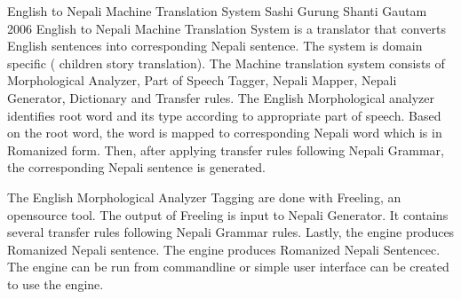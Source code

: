  \begin{conf-abstract}[]
{English to Nepali Machine Translation System}
{
Sashi Gurung
Shanti Gautam
}
{2006}
English to Nepali Machine Translation System is a translator that converts English sentences into corresponding Nepali sentence. The system is domain specific ( children story translation). The Machine translation system consists of Morphological Analyzer, Part of Speech Tagger, Nepali Mapper, Nepali Generator, Dictionary and Transfer rules. The English Morphological analyzer identifies root word and its type according to appropriate part of speech. Based on the root word, the word is mapped to corresponding  Nepali word which is in Romanized form. Then, after applying transfer rules following Nepali Grammar, the corresponding  Nepali sentence is generated.

The English Morphological Analyzer Tagging are done with Freeling, an opensource tool. The output of Freeling is input to Nepali Generator. It contains several transfer rules following Nepali Grammar rules. Lastly, the engine produces Romanized Nepali sentence. The engine produces Romanized Nepali Sentencec. The engine can be run from commandline or simple user interface can be created to use the engine.
  \end{conf-abstract}
